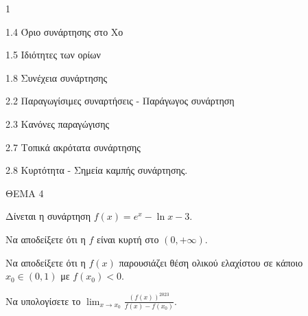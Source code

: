 \begin{ylh}{1}
    \item 1.4 Όριο συνάρτησης στο Χο
    \item 1.5 Ιδιότητες των ορίων
    \item 1.8 Συνέχεια συνάρτησης
    \item 2.2 Παραγωγίσιμες συναρτήσεις - Παράγωγος συνάρτηση
    \item 2.3 Κανόνες παραγώγισης
    \item 2.7 Τοπικά ακρότατα συνάρτησης
    \item 2.8 Κυρτότητα - Σημεία καμπής συνάρτησης.
\end{ylh}

ΘΕΜΑ 4

Δίνεται η συνάρτηση $f(x) = e^x - \ln x - 3$.

\begin{alist}
\item Να αποδείξετε ότι η $f$ είναι κυρτή στο $(0, +\infty)$. 
\item Να αποδείξετε ότι η $f(x)$ παρουσιάζει θέση ολικού ελαχίστου σε κάποιο $x_0 \in (0, 1)$ με $f(x_0) < 0$. 
\item Να υπολογίσετε το $\lim_{x \to x_0} \frac{(f(x))^{2023}}{f(x)-f(x_0)}$. 
\end{alist}